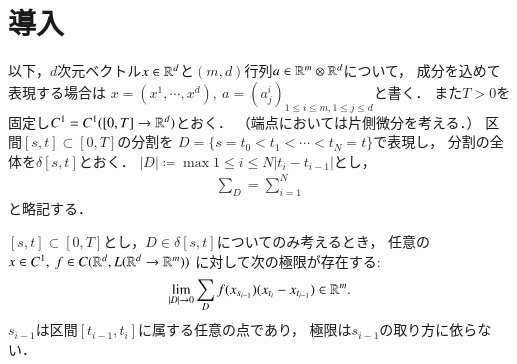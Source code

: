 \section{導入}
	以下，$d$次元ベクトル$x \in \mathbb{R}^d$と$(m, d)$行列$a \in \mathbb{R}^m \otimes \mathbb{R}^d$について，
	成分を込めて表現する場合は
	$x = (x^1,\cdots,x^d),\ a=(a^i_j)_{1 \leq i \leq m,1 \leq j \leq d}$と書く．
	また$T > 0$を固定し$C^1 = C^1([0,T] \rightarrow \mathbb{R}^d)$とおく．
	（端点においては片側微分を考える．）
	区間$[s,t] \subset [0,T]$の分割を
	$D = \{s = t_0 < t_1 < \cdots < t_N = t\}$で表現し，
	分割の全体を$\delta[s,t]$とおく．
	$|D| \coloneqq \max{1 \leq i \leq N}{\left| t_i - t_{i-1} \right|}$とし，
	\begin{align}
		\sum_D = \sum_{i=1}^{N}
	\end{align}
	と略記する．

	\begin{screen}
		\begin{thm}\label{thm:existence_of_Riemann_Stieltjes_integral}
			$[s,t] \subset [0,T]$とし，$D \in \delta[s,t]$についてのみ考えるとき，
			任意の$x \in C^1,\ f \in C(\mathbb{R}^d,L(\mathbb{R}^d \rightarrow \mathbb{R}^m))$
			に対して次の極限が存在する:\footnotemark
			\begin{align}
				\lim_{|D| \to 0}
				\sum_{D} f(x_{s_{i-1}})(x_{t_i} - x_{t_{i-1}})
				\in \mathbb{R}^m.
			\end{align}
			$s_{i-1}$は区間$[t_{i-1},t_i]$に属する任意の点であり，
			極限は$s_{i-1}$の取り方に依らない．
		\end{thm}
	\end{screen}
